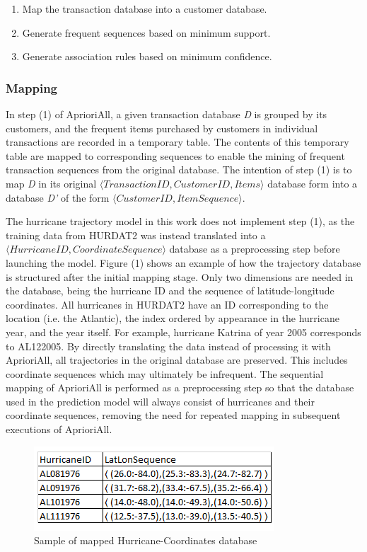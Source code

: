 \documentclass[12pt,conference]{IEEEtran}
\begin{document}
\begin{enumerate}
\item Map the transaction database into a customer database.
\item Generate frequent sequences based on minimum support.
\item Generate association rules based on minimum confidence.
\end{enumerate}

\subsubsection{Mapping}

In step (1) of AprioriAll, a given transaction database \textit{D} is grouped by its customers, and the frequent items purchased by customers in individual transactions are recorded in a temporary table. The contents of this temporary table are mapped to corresponding sequences to enable the mining of frequent transaction sequences from the original database. The intention of step (1) is to map \textit{D} in its original $\langle TransactionID, CustomerID, Items\rangle$ database form into a database \textit{D'} of the form $\langle CustomerID, ItemSequence\rangle$. 

The hurricane trajectory model in this work does not implement step (1), as the training data from HURDAT2 was instead translated into a $\langle HurricaneID, CoordinateSequence\rangle$ database as a preprocessing step before launching the model. Figure (1) shows an example of how the trajectory database is structured after the initial mapping stage. Only two dimensions are needed in the database, being the hurricane ID and the sequence of latitude-longitude coordinates. All hurricanes in HURDAT2 have an ID corresponding to the location (i.e. the Atlantic), the index ordered by appearance in the hurricane year, and the year itself. For example, hurricane Katrina of year 2005 corresponds to AL122005. By directly translating the data instead of processing it with AprioriAll, all trajectories in the original database are preserved. This includes coordinate sequences which may ultimately be infrequent. The sequential mapping of AprioriAll is performed as a preprocessing step so that the database used in the prediction model will always consist of hurricanes and their coordinate sequences, removing the need for repeated mapping in subsequent executions of AprioriAll.

\begin{figure}[ht]
\caption{Sample of mapped Hurricane-Coordinates database}
\centering
\includegraphics[scale=1.0]{hurricane-table-sample}
\end{figure}
\end{document}
